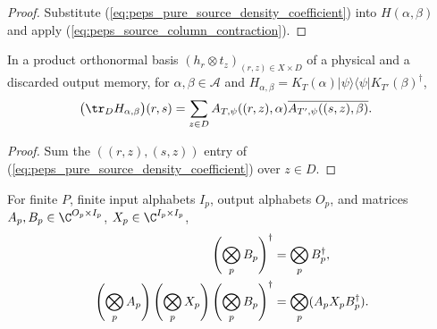 \begin{proof}\leanok
    Substitute (\ref{eq:peps_pure_source_density_coefficient}) into $H(\alpha,\beta)$
    and apply (\ref{eq:peps_source_column_contraction}).
\end{proof}

\begin{lemma}
    \label{thm:peps_pure_source_physical}
    \leanok
    In a product orthonormal basis $(h_r\otimes t_z)_{(r,z)\in X\times D}$ of a
    physical and a discarded output memory, for $\alpha,\beta\in\mathcal A$ and
    $H_{\alpha,\beta}=K_T(\alpha)|\psi\rangle\langle\psi|K_{T'}(\beta)^\dagger$,
    \begin{align}
        \bigl(\tr_D H_{\alpha,\beta}\bigr)(r,s)
         & =\sum_{z\in D}
        A_{T,\psi}((r,z),\alpha)
        \overline{A_{T',\psi}((s,z),\beta)}.
        \label{eq:peps_pure_source_physical}
    \end{align}
\end{lemma}

\begin{proof}\leanok
    Sum the $((r,z),(s,z))$ entry of (\ref{eq:peps_pure_source_density_coefficient})
    over $z\in D$.
\end{proof}

\begin{lemma}
    \label{thm:peps_party_product_conjugation}
    \leanok
    For finite $P$, finite input alphabets $I_p$, output alphabets $O_p$, and
    matrices $A_p,B_p\in\C^{O_p\times I_p}$, $X_p\in\C^{I_p\times I_p}$,
    \begin{align}
        \left(\bigotimes_p B_p\right)^\dagger
         & =\bigotimes_p B_p^\dagger,         \notag \\
        \left(\bigotimes_p A_p\right)
        \left(\bigotimes_p X_p\right)
        \left(\bigotimes_p B_p\right)^\dagger
         & =\bigotimes_p (A_pX_pB_p^\dagger).
        \label{eq:peps_party_product_conjugation}
    \end{align}
\end{lemma}

